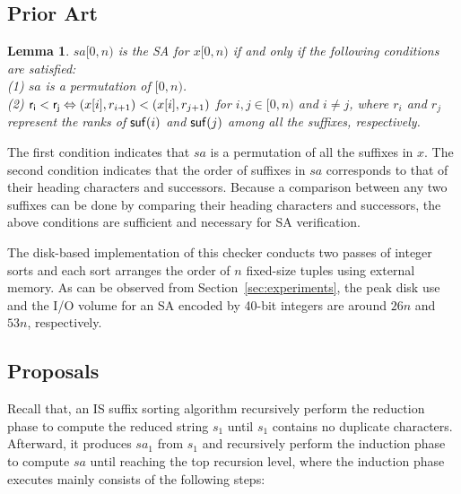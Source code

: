 \documentclass[10pt,journal,compsoc]{IEEEtran}
\newtheorem{lemma}[theorem]{Lemma}
\begin{document}
\subsection{Prior Art} \label{sec:checkers:prior_art}


\begin{lemma} \label{lemma:1}
	$sa[0, n)$ is the SA for $x[0, n)$ if and only if the following conditions are satisfied:\\
	(1) $sa$ is a permutation of $[0, n)$. \\	
	(2) ${\sf r_i < r_j} \Leftrightarrow (x[i], r_{i + 1}) < (x[i], r_{j + 1})$ for $ i, j \in [0, n)$ and $i\ne j$, where $r_i$ and $r_j$ represent the ranks of ${\sf suf}(i)$ and ${\sf suf}(j)$ among all the suffixes, respectively. \\
\end{lemma}

\begin{IEEEproof}The first condition indicates that $sa$ is a permutation of all the suffixes in $x$. The second condition indicates that the order of suffixes in $sa$ corresponds to that of their heading characters and successors. Because a comparison between any two suffixes can be done by comparing their heading characters and successors, the above conditions are sufficient and necessary for SA verification.

\end{IEEEproof}

The disk-based implementation of this checker conducts two passes of integer sorts and each sort arranges the order of $n$ fixed-size tuples using external memory. As can be observed from Section~\ref{sec:experiments}, the peak disk use and the I/O volume for an SA encoded by 40-bit integers are around $26n$ and $53n$, respectively.

\subsection{Proposals} \label{sec:checkers:proposals}

Recall that, an IS suffix sorting algorithm recursively perform the reduction phase to compute the reduced string $s_1$ until $s_1$ contains no duplicate characters. Afterward, it produces $sa_1$ from $s_1$ and recursively perform the induction phase to compute $sa$ until reaching the top recursion level, where the induction phase executes mainly consists of the following steps:
\end{document}
